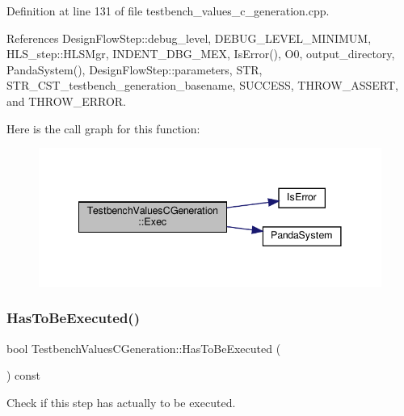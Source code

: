 Definition at line 131 of file testbench\+\_\+values\+\_\+c\+\_\+generation.\+cpp.



References Design\+Flow\+Step\+::debug\+\_\+level, D\+E\+B\+U\+G\+\_\+\+L\+E\+V\+E\+L\+\_\+\+M\+I\+N\+I\+M\+UM, H\+L\+S\+\_\+step\+::\+H\+L\+S\+Mgr, I\+N\+D\+E\+N\+T\+\_\+\+D\+B\+G\+\_\+\+M\+EX, Is\+Error(), O0, output\+\_\+directory, Panda\+System(), Design\+Flow\+Step\+::parameters, S\+TR, S\+T\+R\+\_\+\+C\+S\+T\+\_\+testbench\+\_\+generation\+\_\+basename, S\+U\+C\+C\+E\+SS, T\+H\+R\+O\+W\+\_\+\+A\+S\+S\+E\+RT, and T\+H\+R\+O\+W\+\_\+\+E\+R\+R\+OR.

Here is the call graph for this function\+:
\nopagebreak
\begin{figure}[H]
\begin{center}
\leavevmode
\includegraphics[width=341pt]{d9/d7b/classTestbenchValuesCGeneration_a964570c06f70ce449d63410d9e7b6d81_cgraph}
\end{center}
\end{figure}
\mbox{\label{classTestbenchValuesCGeneration_a56bdb926fdd2e5f08906706e8fba4df5}} 
\subsubsection{\texorpdfstring{Has\+To\+Be\+Executed()}{HasToBeExecuted()}}
{\footnotesize\ttfamily bool Testbench\+Values\+C\+Generation\+::\+Has\+To\+Be\+Executed (\begin{DoxyParamCaption}{ }\end{DoxyParamCaption}) const\hspace{0.3cm}{\ttfamily [virtual]}}



Check if this step has actually to be executed. 

